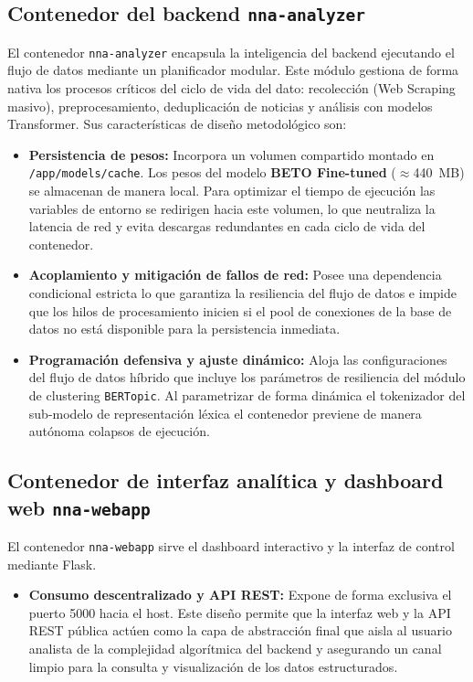 \subsection{Contenedor del backend \texttt{nna-analyzer}}
\label{subsec:met_contenedor_analyzer}

El contenedor \texttt{nna-analyzer} encapsula la inteligencia del backend ejecutando el flujo de datos mediante un planificador modular.
Este módulo gestiona de forma nativa los procesos críticos del ciclo de vida del dato: recolección (Web Scraping masivo),
preprocesamiento, deduplicación de noticias y análisis con modelos Transformer. Sus características de diseño metodológico son:

\begin{itemize}
    \item \textbf{Persistencia de pesos:} Incorpora un volumen compartido montado en \texttt{/app/models/cache}. Los pesos del
    modelo \textbf{BETO Fine-tuned} ($\approx$440~MB) se almacenan de manera local. Para optimizar el tiempo de ejecución
    las variables de entorno se redirigen hacia este volumen, lo que neutraliza la latencia de red y evita descargas redundantes
    en cada ciclo de vida del contenedor.
    \item \textbf{Acoplamiento y mitigación de fallos de red:} Posee una dependencia condicional estricta lo que garantiza la
    resiliencia del flujo de datos e impide que los hilos de procesamiento inicien si el pool de conexiones de la base de datos
    no está disponible para la persistencia inmediata.
    \item \textbf{Programación defensiva y ajuste dinámico:} Aloja las configuraciones del flujo de datos híbrido que incluye
    los parámetros de resiliencia del módulo de clustering \texttt{BERTopic}. Al parametrizar de forma dinámica el tokenizador
    del sub-modelo de representación léxica el contenedor previene de manera autónoma colapsos de ejecución.
\end{itemize}

\subsection{Contenedor de interfaz analítica y dashboard web \texttt{nna-webapp}}
\label{subsec:met_contenedor_webapp}

El contenedor \texttt{nna-webapp} sirve el dashboard interactivo y la interfaz de control mediante Flask.
\begin{itemize}
    \item \textbf{Consumo descentralizado y API REST:} Expone de forma exclusiva el puerto 5000 hacia el host. Este diseño permite
    que la interfaz web y la API REST pública actúen como la capa de abstracción final que aisla al usuario analista de la complejidad
    algorítmica del backend y asegurando un canal limpio para la consulta y visualización de los datos estructurados.
\end{itemize}

